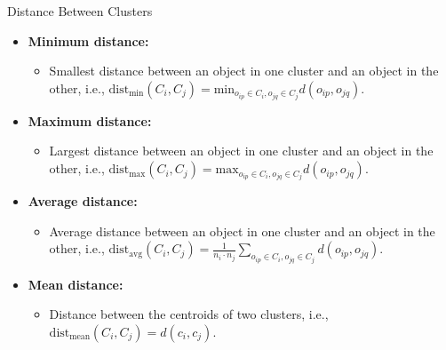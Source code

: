 \begin{frame}{Distance Between Clusters}
	\begin{itemize}
		\item \textbf{Minimum distance:}
		\begin{itemize}
			\item Smallest distance between an object in one cluster and an 
			object in the other, i.e., $\text{dist}_{\text{min}} (C_i, C_j) = 
			\text{min}_{o_{ip} \in C_i, o_{jq} \in C_j} d(o_{ip}, o_{jq})$.
		\end{itemize}
		\item \textbf{Maximum distance:}
		\begin{itemize}
			\item Largest distance between an object in one cluster and an 
			object in the other, i.e., $\text{dist}_\text{max}(C_i, C_j) = 
			\text{max}_{o_{ip} \in C_i, o_{jq} \in C_j} d(o_{ip}, o_{jq}).$
		\end{itemize}
		\item \textbf{Average distance:}
		\begin{itemize}
			\item Average distance between an object in one cluster and an 
			object in the other, i.e., $\text{dist}_{\text{avg}} (C_i, C_j) = 
			\frac{1}{n_i \cdot n_j} \sum_{o_{ip} \in C_i, o_{jq} \in C_j} 
			d(o_{ip}, o_{jq}).$
		\end{itemize}
		\item \textbf{Mean distance:}
		\begin{itemize}
			\item Distance between the centroids of two clusters, i.e., 
			$\text{dist}_{\text{mean}} (C_i, C_j) = d(c_i, c_j).$
		\end{itemize}
	\end{itemize}
\end{frame}

